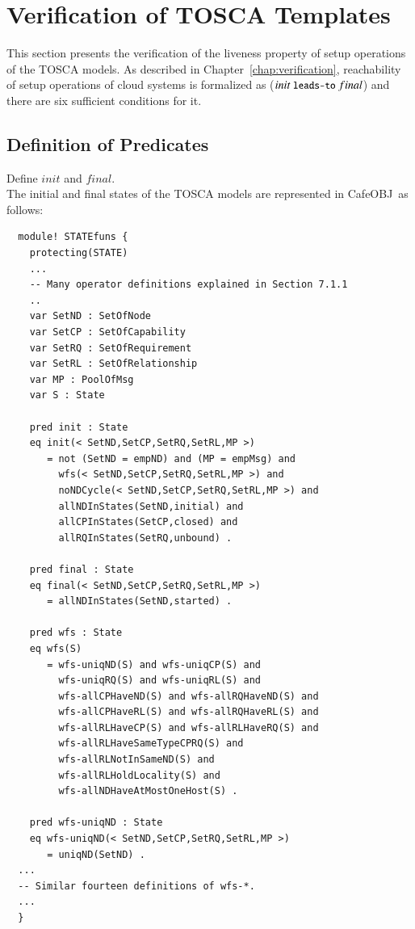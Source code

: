 \documentclass[12pt]{report}
\newcommand{\mbstt}[1]{\mbox{\small{\tt {#1}}}}
\newcommand{\cafeobj}{{\sf CafeOBJ}~}
\begin{document}
\section{Verification of TOSCA Templates}
\label{sec:TOSCAverification}
This section presents the verification of the liveness property of
setup operations of the TOSCA models. As described in
Chapter~\ref{chap:verification}, reachability of setup operations of
cloud systems is formalized as ($init~\mbstt{leads-to}~final$) and
there are six sufficient conditions for it.

\subsection{Definition of Predicates}
\label{sec:TOSCAsupport}
 Define $init$ and $final$. \\
The initial and final states of the TOSCA models are represented in
\cafeobj as follows:
\small
\begin{verbatim}
  module! STATEfuns {
    protecting(STATE)
    ...
    -- Many operator definitions explained in Section 7.1.1
    ..
    var SetND : SetOfNode
    var SetCP : SetOfCapability
    var SetRQ : SetOfRequirement
    var SetRL : SetOfRelationship
    var MP : PoolOfMsg
    var S : State
  
    pred init : State
    eq init(< SetND,SetCP,SetRQ,SetRL,MP >)
       = not (SetND = empND) and (MP = empMsg) and
         wfs(< SetND,SetCP,SetRQ,SetRL,MP >) and
         noNDCycle(< SetND,SetCP,SetRQ,SetRL,MP >) and
         allNDInStates(SetND,initial) and 
         allCPInStates(SetCP,closed) and 
         allRQInStates(SetRQ,unbound) .
  
    pred final : State
    eq final(< SetND,SetCP,SetRQ,SetRL,MP >)
       = allNDInStates(SetND,started) .
  
    pred wfs : State
    eq wfs(S)
       = wfs-uniqND(S) and wfs-uniqCP(S) and 
         wfs-uniqRQ(S) and wfs-uniqRL(S) and
         wfs-allCPHaveND(S) and wfs-allRQHaveND(S) and 
         wfs-allCPHaveRL(S) and wfs-allRQHaveRL(S) and 
         wfs-allRLHaveCP(S) and wfs-allRLHaveRQ(S) and 
         wfs-allRLHaveSameTypeCPRQ(S) and
         wfs-allRLNotInSameND(S) and
         wfs-allRLHoldLocality(S) and
         wfs-allNDHaveAtMostOneHost(S) .
  
    pred wfs-uniqND : State
    eq wfs-uniqND(< SetND,SetCP,SetRQ,SetRL,MP >)
       = uniqND(SetND) .
  ...
  -- Similar fourteen definitions of wfs-*.  
  ...
  }
\end{verbatim}
\normalsize
\end{document}
